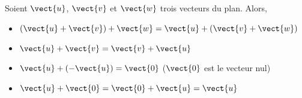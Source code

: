 \documentclass{article}
\begin{document}
\begin{proposition}
Soient $\vect{u}$, $\vect{v}$ et $\vect{w}$ trois vecteurs du plan. Alors,
\begin{itemize}
\item $(\vect{u} + \vect{v}) + \vect{w} = \vect{u} + (\vect{v} + \vect{w})$
\item $\vect{u} + \vect{v} = \vect{v} + \vect{u}$
\item $\vect{u} + (- \vect{u}) = \vect{0}$ ($\vect{0}$ est le vecteur nul)
\item $\vect{u} + \vect{0} = \vect{0} + \vect{u} = \vect{u}$
\end{itemize}
\end{proposition}
\end{document}
